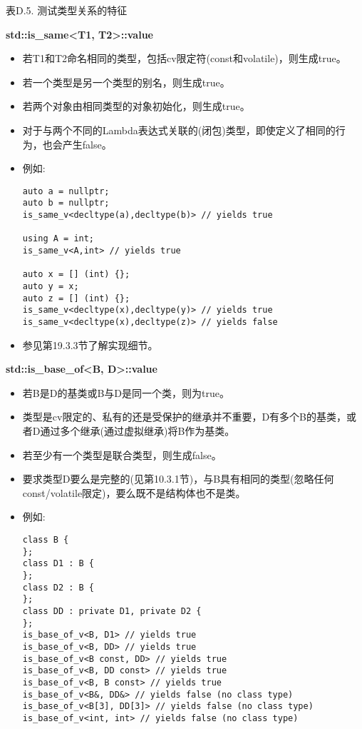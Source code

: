 \begin{center}
表D.5. 测试类型关系的特征
\end{center}

\textbf{std::is\_same<T1, T2>::value}

\begin{itemize}
\item
若T1和T2命名相同的类型，包括cv限定符(const和volatile)，则生成true。

\item
若一个类型是另一个类型的别名，则生成true。

\item
若两个对象由相同类型的对象初始化，则生成true。

\item
对于与两个不同的Lambda表达式关联的(闭包)类型，即使定义了相同的行为，也会产生false。

\item
例如:
\begin{lstlisting}[style=styleCXX]
auto a = nullptr;
auto b = nullptr;
is_same_v<decltype(a),decltype(b)> // yields true

using A = int;
is_same_v<A,int> // yields true

auto x = [] (int) {};
auto y = x;
auto z = [] (int) {};
is_same_v<decltype(x),decltype(y)> // yields true
is_same_v<decltype(x),decltype(z)> // yields false
\end{lstlisting}

\item
参见第19.3.3节了解实现细节。
\end{itemize}

\textbf{std::is\_base\_of<B, D>::value}

\begin{itemize}
\item
若B是D的基类或B与D是同一个类，则为true。

\item
类型是cv限定的、私有的还是受保护的继承并不重要，D有多个B的基类，或者D通过多个继承(通过虚拟继承)将B作为基类。

\item
若至少有一个类型是联合类型，则生成false。

\item
要求类型D要么是完整的(见第10.3.1节)，与B具有相同的类型(忽略任何const/volatile限定)，要么既不是结构体也不是类。

\item
例如:
\begin{lstlisting}[style=styleCXX]
class B {
};
class D1 : B {
};
class D2 : B {
};
class DD : private D1, private D2 {
};
is_base_of_v<B, D1> // yields true
is_base_of_v<B, DD> // yields true
is_base_of_v<B const, DD> // yields true
is_base_of_v<B, DD const> // yields true
is_base_of_v<B, B const> // yields true
is_base_of_v<B&, DD&> // yields false (no class type)
is_base_of_v<B[3], DD[3]> // yields false (no class type)
is_base_of_v<int, int> // yields false (no class type)
\end{lstlisting}
\end{itemize}

